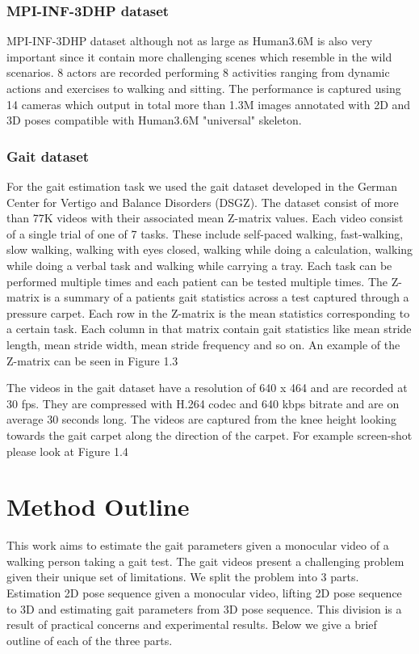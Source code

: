 \subsubsection{MPI-INF-3DHP dataset}

MPI-INF-3DHP dataset although not as large as Human3.6M is also very important since it contain more challenging scenes which resemble in the wild scenarios. 8 actors are recorded performing 8 activities ranging from dynamic actions and exercises to walking and sitting. The performance is captured using 14 cameras which output in total more than 1.3M images annotated with 2D and 3D poses compatible with Human3.6M "universal" skeleton.

\subsubsection{Gait dataset}

For the gait estimation task we used the gait dataset developed in the German Center for Vertigo and Balance Disorders (DSGZ). The dataset consist of more than 77K videos with their associated mean Z-matrix values. Each video consist of a single trial of one of 7 tasks. These include self-paced walking, fast-walking, slow walking, walking with eyes closed, walking while doing a calculation, walking while doing a verbal task and walking while carrying a tray. Each task can be performed multiple times and each patient can be tested multiple times. The Z-matrix is a summary of a patients gait statistics across a test captured through a pressure carpet. Each row in the Z-matrix is the mean statistics corresponding to a certain task. Each column in that matrix contain gait statistics like mean stride length, mean stride width, mean stride frequency and so on. An example of the Z-matrix can be seen in Figure 1.3

The videos in the gait dataset have a resolution of 640 x 464 and are recorded at 30 fps. They are compressed with H.264 codec and 640 kbps bitrate and are on average 30 seconds long. The videos are captured from the knee height looking towards the gait carpet along the direction of the carpet. For example screen-shot please look at Figure 1.4

\section{Method Outline}

This work aims to estimate the gait parameters given a monocular video of a walking person taking a gait test. The gait videos present a challenging problem given their unique set of limitations. We split the problem into 3 parts. Estimation 2D pose sequence given a monocular video, lifting 2D pose sequence to 3D and estimating gait parameters from 3D pose sequence. This division is a result of practical concerns and experimental results. Below we give a brief outline of each of the three parts.

